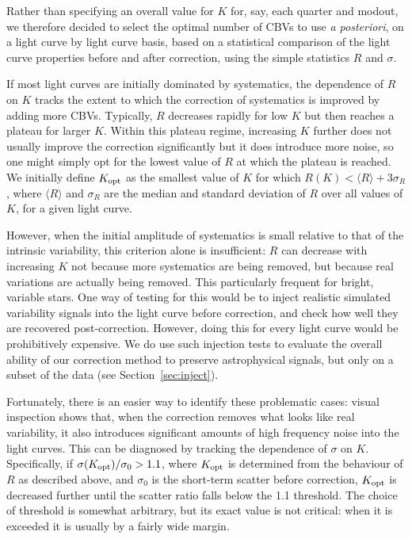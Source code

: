 \documentclass[useAMS,usenatbib]{mn2e}
\begin{document}
Rather than specifying an overall value for $K$ for, say, each
quarter and modout, we therefore decided to select the optimal number
of CBVs to use \textit{a posteriori}, on a light curve by light curve basis,
based on a statistical comparison of the light curve properties before
and after correction, using the simple statistics $R$ and $\sigma$. 

If most light curves are
initially dominated by systematics, the dependence of $R$ on $K$
tracks the extent to which the correction of systematics is improved
by adding more CBVs. Typically, $R$ decreases rapidly for low $K$ but
then reaches a plateau for larger $K$. Within this plateau regime, increasing
$K$ further does not usually improve the correction
significantly but it does introduce more noise, so one might simply
opt for the lowest value of $R$ at which the plateau is
reached. We initially define $K_{\rm opt}$ as the smallest value of $K$ for which $R(K)
< \langle R \rangle + 3 \sigma_R$, where $\langle R \rangle$ and
$\sigma_R$ are the median and standard deviation of $R$ over all
values of $K$, for a given light curve. 

However, when the initial amplitude of systematics is small relative
to that of the intrinsic variability, this criterion alone is
insufficient: $R$ can decrease with increasing $K$ not because more
systematics are being removed, but because real variations are
actually being removed. This particularly frequent for bright,
variable stars. One way of testing for this would be to inject
realistic simulated variability signals into the light curve before
correction, and check how well they are recovered
post-correction. However, doing this for every light curve would be
prohibitively expensive. We do use such injection tests to
evaluate the overall ability of our correction method to preserve
astrophysical signals, but only on a subset of the data (see
Section~\ref{sec:inject}).

Fortunately, there is an easier way to
identify these problematic cases: visual inspection shows that, when
the correction removes what looks like real variability, it also
introduces significant amounts of high frequency noise into the light curves. This can be
diagnosed by tracking the dependence of $\sigma$ on $K$. Specifically, if
$\sigma(K_{\rm opt})/\sigma_0>1.1 $, where $K_{\rm opt}$ is determined
from the behaviour of $R$ as described above, and $\sigma_0$ is the
short-term scatter before correction, $K_{\rm opt}$ is decreased further
until the scatter ratio falls below the 1.1 threshold. The choice of
threshold is somewhat arbitrary, but its exact value is not
critical: when it is exceeded it is usually by a fairly wide margin.
\end{document}
